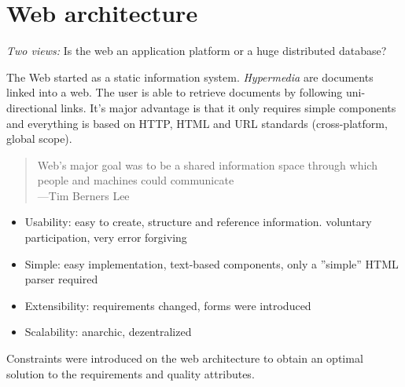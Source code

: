 \documentclass[a4paper]{report}
\begin{document}
\chapter{Web architecture}

\emph{Two views:} Is the web an application platform or a huge distributed
database?

The Web started as a static information system. \emph{Hypermedia} are
documents linked into a web. The user is able to retrieve documents by
following uni-directional links. It's major advantage is that it only
requires simple components and everything is based on HTTP, HTML and
URL standards (cross-platform, global scope).

\begin{quote}
    Web's major goal was to be a shared information space
    through which people and machines could communicate \\
    ---Tim Berners Lee
\end{quote}

\begin{itemize}
  \item Usability: easy to create, structure and reference information.
        voluntary participation, very error forgiving
  \item Simple: easy implementation, text-based components, only a
        ''simple'' HTML parser required
  \item Extensibility: requirements changed, forms were introduced
  \item Scalability: anarchic, dezentralized
\end{itemize}

Constraints were introduced on the web architecture to obtain an optimal
solution to the requirements and quality attributes.
\end{document}
